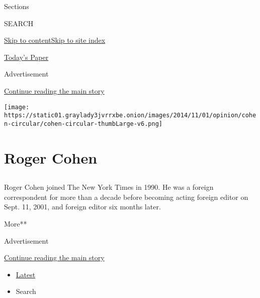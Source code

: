 Sections

SEARCH

\protect\hyperlink{site-content}{Skip to
content}\protect\hyperlink{site-index}{Skip to site index}

\href{https://myaccount.nytimes3xbfgragh.onion/auth/login?response_type=cookie\&client_id=vi}{}

\href{https://www.nytimes3xbfgragh.onion/section/todayspaper}{Today's
Paper}

Advertisement

\protect\hyperlink{after-top}{Continue reading the main story}

\texttt{[image: https://static01.graylady3jvrrxbe.onion/images/2014/11/01/opinion/cohen-circular/cohen-circular-thumbLarge-v6.png]}

\hypertarget{roger-cohen}{%
\section{Roger Cohen}\label{roger-cohen}}

\subsection{}

Roger Cohen joined The New York Times in 1990. He was a foreign
correspondent for more than a decade before becoming acting foreign
editor on Sept. 11, 2001, and foreign editor six months later.

More**

Advertisement

\protect\hyperlink{after-mid1}{Continue reading the main story}

\begin{itemize}
\tightlist
\item
  \protect\hyperlink{stream-panel}{Latest}
\item
  Search
\end{itemize}

